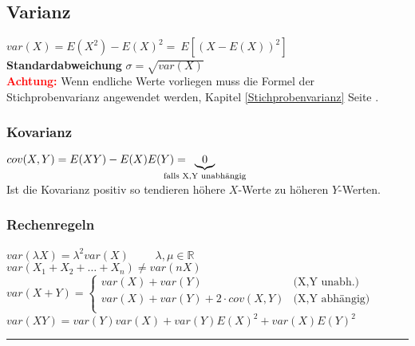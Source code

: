\begin{minipage}{0.42\textwidth}
	\vspace{2mm}
	\subsection{Varianz}
	$\boxed{var(X)=E(X^2)-E(X)^2}= \:E[(X-E(X))^2]$\\[2pt]
	\textbf{Standardabweichung} $\sigma = \sqrt{var(X)}$\\[2pt]
	
	\textcolor{red}{\textbf{Achtung:}} Wenn endliche Werte vorliegen muss die Formel der Stichprobenvarianz angewendet werden, Kapitel \ref{Stichprobenvarianz} Seite \pageref{Stichprobenvarianz}.

	\subsubsection{Kovarianz}
	$cov(X,Y)=E(XY)-E(X)E(Y)=\hspace{-0.8cm}\underbrace{0}_{\text{falls X,Y unabhängig}}$\\[2pt]
	Ist die Kovarianz positiv so tendieren höhere $X$-Werte zu höheren $Y$-Werten.
	\vspace{.2cm}
\end{minipage}
\hspace{0.02\textwidth}
\begin{minipage}{0.56\textwidth}
	\vspace{2mm}
	\subsubsection{Rechenregeln}
		$var(\lambda X)=\lambda^2 var(X) \qquad $ $\lambda, \mu \in \mathbb{R}$\\[4pt]
		$var(X_1+X_2+\ldots+X_n) \neq var(n X)$ \\[4pt]
		$var(X+Y)= 
			\begin{cases}
		  		var(X)+var(Y) & \text{(X,Y unabh.)}\\                
		  		var(X) + var(Y) + 2 \cdot cov(X,Y) & \text{(X,Y abhängig)}\\
			\end{cases} $ \\[4pt]
		$var(X Y)= var(Y)var(X)+var(Y)E(X)^2+var(X)E(Y)^2$ \\
	\vspace{.2cm}
\end{minipage}

\hrule

